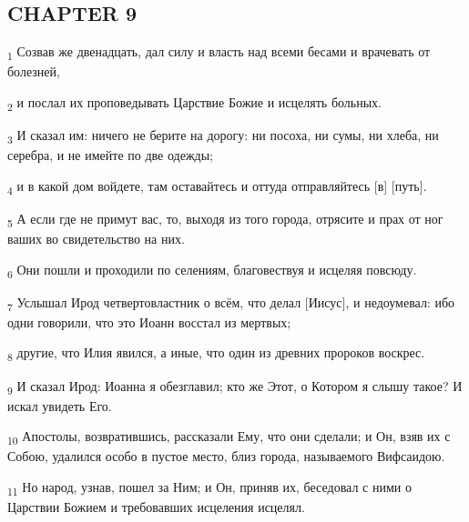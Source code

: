 \subsection{CHAPTER 9}
\begin{tcolorbox}
\textsubscript{1} Созвав же двенадцать, дал силу и власть над всеми бесами и врачевать от болезней,
\end{tcolorbox}
\begin{tcolorbox}
\textsubscript{2} и послал их проповедывать Царствие Божие и исцелять больных.
\end{tcolorbox}
\begin{tcolorbox}
\textsubscript{3} И сказал им: ничего не берите на дорогу: ни посоха, ни сумы, ни хлеба, ни серебра, и не имейте по две одежды;
\end{tcolorbox}
\begin{tcolorbox}
\textsubscript{4} и в какой дом войдете, там оставайтесь и оттуда отправляйтесь [в] [путь].
\end{tcolorbox}
\begin{tcolorbox}
\textsubscript{5} А если где не примут вас, то, выходя из того города, отрясите и прах от ног ваших во свидетельство на них.
\end{tcolorbox}
\begin{tcolorbox}
\textsubscript{6} Они пошли и проходили по селениям, благовествуя и исцеляя повсюду.
\end{tcolorbox}
\begin{tcolorbox}
\textsubscript{7} Услышал Ирод четвертовластник о всём, что делал [Иисус], и недоумевал: ибо одни говорили, что это Иоанн восстал из мертвых;
\end{tcolorbox}
\begin{tcolorbox}
\textsubscript{8} другие, что Илия явился, а иные, что один из древних пророков воскрес.
\end{tcolorbox}
\begin{tcolorbox}
\textsubscript{9} И сказал Ирод: Иоанна я обезглавил; кто же Этот, о Котором я слышу такое? И искал увидеть Его.
\end{tcolorbox}
\begin{tcolorbox}
\textsubscript{10} Апостолы, возвратившись, рассказали Ему, что они сделали; и Он, взяв их с Собою, удалился особо в пустое место, близ города, называемого Вифсаидою.
\end{tcolorbox}
\begin{tcolorbox}
\textsubscript{11} Но народ, узнав, пошел за Ним; и Он, приняв их, беседовал с ними о Царствии Божием и требовавших исцеления исцелял.
\end{tcolorbox}
